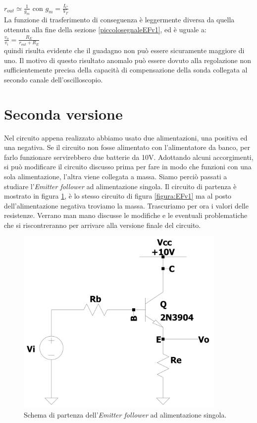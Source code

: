 \documentclass{report}
\begin{document}
\\[2pt]\indent$\displaystyle{r_{out}\simeq\frac{1}{g_m}}$ \indent con  $\displaystyle{g_m=\frac{I_C}{V_T}}$
\\[2pt]La funzione di trasferimento di conseguenza è leggermente diversa da quella ottenuta alla fine della sezione \ref{piccolosegnaleEFv1}, ed è uguale a:
\\[2pt]\indent $\displaystyle{\frac{v_o}{v_i}=\frac{R_E}{r_{out}+R_E}}$
\\[2pt]quindi risulta evidente che il guadagno non può essere sicuramente maggiore di uno. Il motivo di questo risultato anomalo può essere dovuto alla regolazione non sufficientemente precisa della capacità di compensazione della sonda collegata al secondo canale dell'oscilloscopio.
\section{Seconda versione} %
\label{EFv2cap}
Nel circuito appena realizzato abbiamo usato due alimentazioni, una positiva ed una negativa. Se il circuito non fosse alimentato con l'alimentatore da banco, per farlo funzionare servirebbero due batterie da 10V. Adottando alcuni accorgimenti, si può modificare il circuito discusso prima per fare in modo che funzioni con una sola alimentazione, l'altra viene collegata a massa. Siamo perciò passati a studiare l'\textit{Emitter follower} ad alimentazione singola. Il circuito di partenza è mostrato in figura \ref{figura:EFv2_1}, è lo stesso circuito di figura \ref{figura:EFv1} ma al posto dell'alimentazione negativa troviamo la massa. Trascuriamo per ora i valori delle resistenze. Verrano man mano discusse le modifiche e le eventuali problematiche che si riscontreranno per arrivare alla versione finale del circuito.
\begin{figure}[h]
\centering
\includegraphics[height=9.1cm]{immagini/EFv2_1}
\caption{Schema di partenza dell'\textit{Emitter follower} ad alimentazione singola.}
\label{figura:EFv2_1}
\end{figure}
\end{document}
